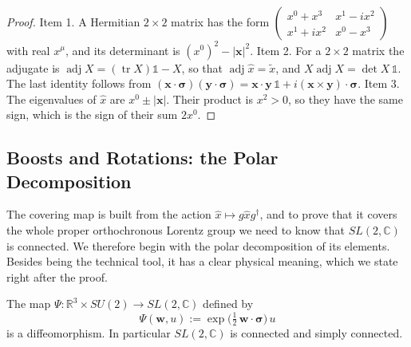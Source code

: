 	\begin{proof}
		Item 1. A Hermitian $2\times2$ matrix has the form $\begin{pmatrix}x^0+x^3&x^1-ix^2\\x^1+ix^2&x^0-x^3\end{pmatrix}$ with real $x^\mu$, and its determinant is $(x^0)^2-|\mathbf{x}|^2$. Item 2. For a $2\times2$ matrix the adjugate is $\operatorname{adj}X=(\operatorname{tr}X)\mathbb{1}-X$, so that $\operatorname{adj}\hat{x}=\tilde{x}$, and $X\operatorname{adj}X=\det X\,\mathbb{1}$. The last identity follows from $(\mathbf{x}\cdot\boldsymbol{\sigma})(\mathbf{y}\cdot\boldsymbol{\sigma})=\mathbf{x}\cdot\mathbf{y}\,\mathbb{1}+i(\mathbf{x}\times\mathbf{y})\cdot\boldsymbol{\sigma}$. Item 3. The eigenvalues of $\hat{x}$ are $x^0\pm|\mathbf{x}|$. Their product is $x^2>0$, so they have the same sign, which is the sign of their sum $2x^0$.
	\end{proof}
	
	\subsection*{Boosts and Rotations: the Polar Decomposition}
	
	The covering map is built from the action $\hat{x}\mapsto g\hat{x}g^\dagger$, and to prove that it covers the whole proper orthochronous Lorentz group we need to know that $SL(2,\mathbb{C})$ is connected. We therefore begin with the polar decomposition of its elements. Besides being the technical tool, it has a clear physical meaning, which we state right after the proof.
	
	\begin{lemma}\label{lem:polar}
		The map $\Psi:\mathbb{R}^3\times SU(2)\to SL(2,\mathbb{C})$ defined by
		\begin{equation}
			\Psi(\mathbf{w},u):=\exp\!\big(\tfrac12\,\mathbf{w}\cdot\boldsymbol{\sigma}\big)\,u
		\end{equation}
		is a diffeomorphism. In particular $SL(2,\mathbb{C})$ is connected and simply connected.
	\end{lemma}
	
